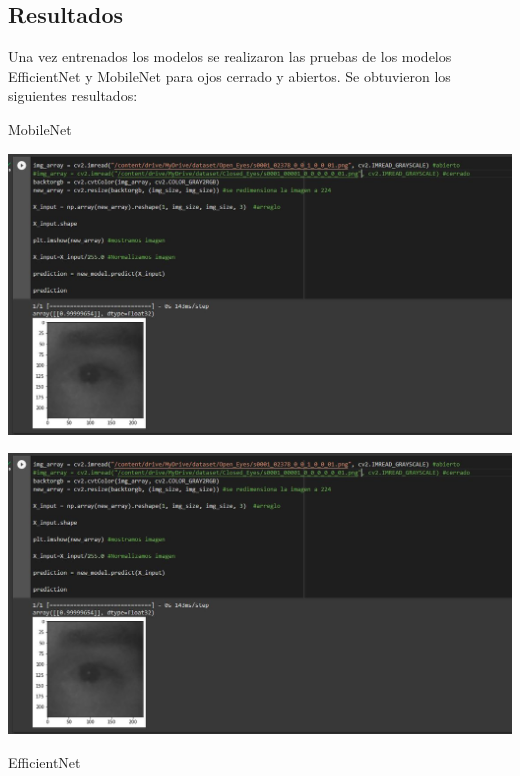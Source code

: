 \documentclass[12pt,letterpaper]{article}
\begin{document}
\subsection{Resultados}

Una vez entrenados los modelos se realizaron las pruebas de los modelos EfficientNet y MobileNet para ojos cerrado y abiertos.
Se obtuvieron los siguientes resultados:

 MobileNet


\begin{center}
  \includegraphics[scale=0.4]{imagenes/ojo_cerradoEN.JPG}
 \label{fig:Prueba1} 
\end{center} 

\begin{center}
  \includegraphics[scale=0.4]{imagenes/ojo_abiertoEN.JPG}
 \label{fig:Prueb2} 
\end{center} 


EfficientNet
\end{document}
